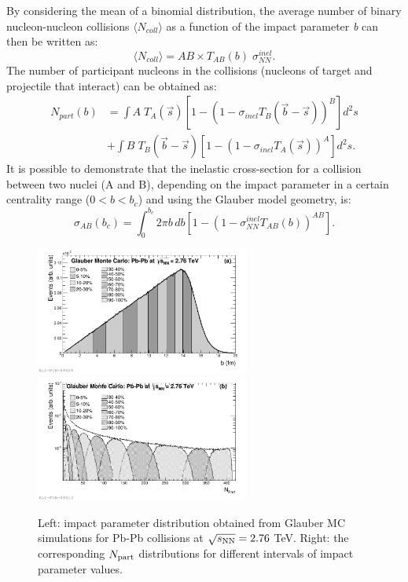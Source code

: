 By considering the mean of a binomial distribution, the average number of binary nucleon-nucleon collisions $\langle N_{coll}\rangle$ as a function of the impact parameter \textit{b} can then be written as:
\begin{equation}
\langle N_{coll}\rangle = AB \times T_{AB}(b)\; \sigma^{inel}_{NN}.
\end{equation}
The number of participant nucleons in the collisions (nucleons of target and projectile that interact) can be obtained as:
\begin{equation}
\begin{aligned}
N_{part} (b) &= \int A \; T_A(\vec{s}) [1- (1- \sigma_{inel} T_B(\vec{b}-\vec{s}))^B]d^2s \\
& + \int B \; T_B(\vec{b}-\vec{s}) [1- (1- \sigma_{inel} T_A(\vec{s}))^A]d^2s.
\end{aligned}
\end{equation}
It is possible to demonstrate that the inelastic cross-section for a collision between two nuclei (A and B), depending on the impact parameter in a certain centrality range ($0 < b < b_c$) and using the Glauber model geometry, is:
\begin{equation}
\label{eq:sigmaABGlauber}
\sigma_{AB}(b_c) = \int_0^{b_c} 2\pi b\,db [1 - (1 - \sigma^{inel}_{NN}T_{AB}(b))^{AB}]. %
\end{equation}
\begin{figure}[!t]
\centering
\includegraphics[width=7cm]{FigCap1/Glauberimpactpar.pdf}
\includegraphics[width=7cm]{FigCap1/GlauberNpart.pdf}
\caption{Left: impact parameter distribution obtained from Glauber MC simulations for Pb-Pb collisions at $\sqrt{s_{\rm NN}} = 2.76$ TeV. Right: the corresponding $N_{\rm part}$ distributions for different intervals of impact parameter values.}
\label{fig:glaubMC}
\end{figure}
